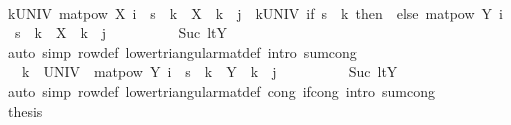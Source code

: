 \begin{isabellebody}
\ \ \ \ \isamarkupfalse%
\ {\isacharminus}{\kern0pt}\isanewline
\ \ \ \ \ \ \isamarkupfalse%
\ {\isachardoublequoteopen}{\isacharparenleft}{\kern0pt}{\isasymSum}k{\isasymin}UNIV{\isachardot}{\kern0pt}\ matpow\ X\ i\ {\isachardollar}{\kern0pt}\ s{\isacharprime}{\kern0pt}\ {\isachardollar}{\kern0pt}\ k\ {\isacharasterisk}{\kern0pt}\ X\ {\isachardollar}{\kern0pt}\ k\ {\isachardollar}{\kern0pt}\ j{\isacharparenright}{\kern0pt}\ {\isacharequal}{\kern0pt}\ {\isacharparenleft}{\kern0pt}{\isasymSum}k{\isasymin}UNIV{\isachardot}{\kern0pt}\ if\ s{\isacharprime}{\kern0pt}\ {\isacharless}{\kern0pt}\ k\ then\ {}\ else\ matpow\ Y\ i\ {\isachardollar}{\kern0pt}\ s{\isacharprime}{\kern0pt}\ {\isachardollar}{\kern0pt}\ k\ {\isacharasterisk}{\kern0pt}\ X\ {\isachardollar}{\kern0pt}\ k\ {\isachardollar}{\kern0pt}\ j{\isacharparenright}{\kern0pt}{\isachardoublequoteclose}\isanewline
\ \ \ \ \ \ \ \ \isamarkupfalse%
\ Suc\ ltY\isanewline
\ \ \ \ \ \ \ \ \isamarkupfalse%
\ {\isacharparenleft}{\kern0pt}auto\ simp{\isacharcolon}{\kern0pt}\ row{\isacharunderscore}{\kern0pt}def\ lower{\isacharunderscore}{\kern0pt}triangular{\isacharunderscore}{\kern0pt}mat{\isacharunderscore}{\kern0pt}def\ intro{\isacharbang}{\kern0pt}{\isacharcolon}{\kern0pt}\ sum{\isachardot}{\kern0pt}cong{\isacharparenright}{\kern0pt}\isanewline
\ \ \ \ \ \ \isamarkupfalse%
\ \isamarkupfalse%
\ {\isachardoublequoteopen}{\isasymdots}\ {\isacharequal}{\kern0pt}\ {\isacharparenleft}{\kern0pt}{\isasymSum}k\ {\isasymin}\ UNIV\ {\isachardot}{\kern0pt}\ matpow\ Y\ i\ {\isachardollar}{\kern0pt}\ s{\isacharprime}{\kern0pt}\ {\isachardollar}{\kern0pt}\ k\ {\isacharasterisk}{\kern0pt}\ Y\ {\isachardollar}{\kern0pt}\ k\ {\isachardollar}{\kern0pt}\ j{\isacharparenright}{\kern0pt}{\isachardoublequoteclose}\isanewline
\ \ \ \ \ \ \ \ \isamarkupfalse%
\ Suc\ ltY\isanewline
\ \ \ \ \ \ \ \ \isamarkupfalse%
\ {\isacharparenleft}{\kern0pt}auto\ simp{\isacharcolon}{\kern0pt}\ row{\isacharunderscore}{\kern0pt}def\ lower{\isacharunderscore}{\kern0pt}triangular{\isacharunderscore}{\kern0pt}mat{\isacharunderscore}{\kern0pt}def\ cong{\isacharcolon}{\kern0pt}\ if{\isacharunderscore}{\kern0pt}cong\ intro{\isacharbang}{\kern0pt}{\isacharcolon}{\kern0pt}\ sum{\isachardot}{\kern0pt}cong{\isacharparenright}{\kern0pt}\isanewline
\ \ \ \ \ \ \isamarkupfalse%
\ \isamarkupfalse%
\ {\isacharquery}{\kern0pt}thesis\isacommand{{\isachardot}{\kern0pt}}\isamarkupfalse%

\end{isabellebody}
